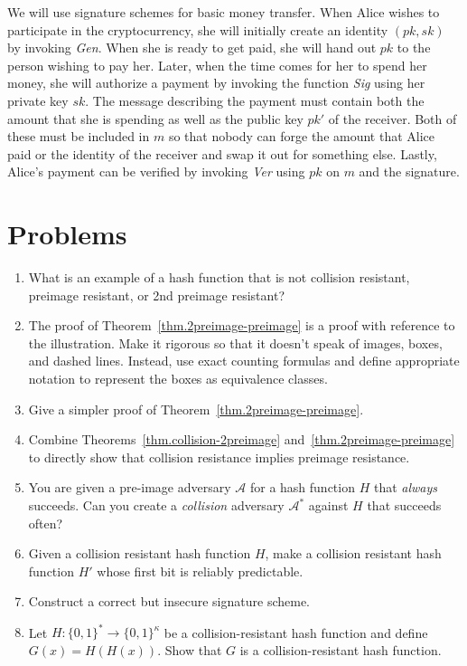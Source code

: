 We will use signature schemes for basic money transfer. When Alice wishes to participate
in the cryptocurrency, she will initially create an identity $(pk, sk)$ by invoking
\emph{Gen}. When she is ready to get paid, she will hand out $pk$ to the person wishing to
pay her. Later, when the time comes for her to spend her money, she will authorize a payment
by invoking the function \emph{Sig} using her private key $sk$. The message describing
the payment must contain both the amount that she is spending as well as the public key
$pk'$ of the receiver. Both of these must be included in $m$ so that nobody can forge
the amount that Alice paid or the identity of the receiver and swap it out for something
else. Lastly, Alice's payment can be verified by invoking \emph{Ver} using $pk$ on $m$ and the signature.

\section*{Problems}

\begin{enumerate}
  \item What is an example of a hash function that is not collision resistant, preimage resistant, or
  2nd preimage resistant?
  \item The proof of Theorem~\ref{thm.2preimage-preimage} is a proof with reference to the illustration. Make it rigorous so that it doesn't speak of images, boxes, and dashed lines. Instead, use exact counting formulas and define appropriate notation to represent the boxes as equivalence classes.
  \item Give a simpler proof of Theorem~\ref{thm.2preimage-preimage}.
  \item Combine Theorems~\ref{thm.collision-2preimage} and~\ref{thm.2preimage-preimage} to
        directly show that collision resistance implies preimage resistance.
  \item You are given a pre-image adversary $\mathcal{A}$ for a hash function $H$ that \emph{always}
        succeeds. Can you create a \emph{collision} adversary $\mathcal{A}^*$ against $H$
        that succeeds often?
  \item Given a collision resistant hash function $H$,
        make a collision resistant hash function $H'$ whose first bit is reliably predictable.
  \item Construct a correct but insecure signature scheme.
  \item Let $H:\{0,1\}^* \to \{0,1\}^{\kappa}$ be a collision-resistant hash function and define
        $G(x) = H(H(x))$. Show that $G$ is a collision-resistant hash function.
\end{enumerate}

